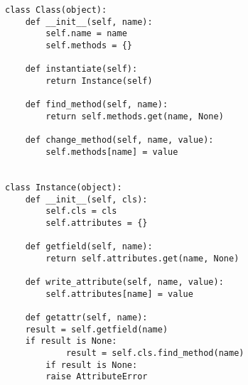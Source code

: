 \begin{lstlisting}[mathescape,basicstyle=\ttfamily,numbers = right]
class Class(object):
    def __init__(self, name):
        self.name = name
        self.methods = {}

    def instantiate(self):
        return Instance(self)

    def find_method(self, name):
        return self.methods.get(name, None)

    def change_method(self, name, value):
        self.methods[name] = value


class Instance(object):
    def __init__(self, cls):
        self.cls = cls
        self.attributes = {}

    def getfield(self, name):
        return self.attributes.get(name, None)

    def write_attribute(self, name, value):
        self.attributes[name] = value

    def getattr(self, name):
	result = self.getfield(name)
	if result is None:
            result = self.cls.find_method(name)
	    if result is None:
		raise AttributeError
\end{lstlisting}
